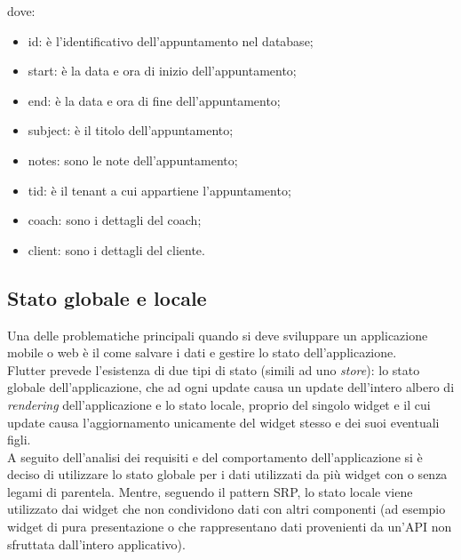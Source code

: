 \begin{enumerate}
    dove: \begin{itemize}
        \item id: è l'identificativo dell'appuntamento nel database;
        \item start: è la data e ora di inizio dell'appuntamento;
        \item end: è la data e ora di fine dell'appuntamento;
        \item subject: è il titolo dell'appuntamento;
        \item notes: sono le note dell'appuntamento;
        \item tid: è il tenant a cui appartiene l'appuntamento;
        \item coach: sono i dettagli del coach;
        \item client: sono i dettagli del cliente.
    \end{itemize}
\end{enumerate}
\subsection{Stato globale e locale}
Una delle problematiche principali quando si deve sviluppare un applicazione mobile o web è il come salvare i dati e gestire lo stato dell'applicazione.\\

Flutter prevede l’esistenza di due tipi di stato (simili ad uno \textit{store}): lo stato globale dell’applicazione, che ad ogni update causa un update dell’intero albero di \textit{rendering} dell’applicazione e lo stato locale, proprio del singolo widget e il cui update causa l’aggiornamento unicamente del widget stesso e dei suoi eventuali figli.\\
A seguito dell’analisi dei requisiti e del comportamento dell’applicazione si è deciso di utilizzare lo stato globale per i dati utilizzati da più widget con o senza legami di parentela. Mentre, seguendo il pattern \gls{SRP}, lo stato locale viene utilizzato dai widget che non condividono dati con altri componenti (ad esempio widget di pura presentazione o che rappresentano dati provenienti da un’API non sfruttata dall’intero applicativo).\\

